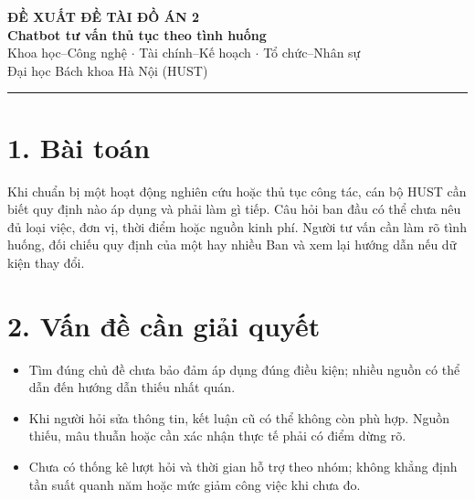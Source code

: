 \documentclass[12pt,a4paper]{article}
\begin{document}
\begin{center}
{\small\bfseries ĐỀ XUẤT ĐỀ TÀI ĐỒ ÁN 2}\\[3pt]
{\Large\bfseries Chatbot tư vấn thủ tục theo tình huống}\\[3pt]
{\small Khoa học--Công nghệ \(\cdot\) Tài chính--Kế hoạch \(\cdot\) Tổ chức--Nhân sự}\\[1pt]
{\small Đại học Bách khoa Hà Nội (HUST)}
\end{center}
\vspace{-5pt}
\noindent\rule{\textwidth}{0.5pt}

\section*{1. Bài toán}
Khi chuẩn bị một hoạt động nghiên cứu hoặc thủ tục công tác, cán bộ HUST cần biết quy định nào áp dụng và phải làm gì tiếp. Câu hỏi ban đầu có thể chưa nêu đủ loại việc, đơn vị, thời điểm hoặc nguồn kinh phí. Người tư vấn cần làm rõ tình huống, đối chiếu quy định của một hay nhiều Ban và xem lại hướng dẫn nếu dữ kiện thay đổi.

\section*{2. Vấn đề cần giải quyết}
\begin{itemize}
\item Tìm đúng chủ đề chưa bảo đảm áp dụng đúng điều kiện; nhiều nguồn có thể dẫn đến hướng dẫn thiếu nhất quán.
\item Khi người hỏi sửa thông tin, kết luận cũ có thể không còn phù hợp. Nguồn thiếu, mâu thuẫn hoặc cần xác nhận thực tế phải có điểm dừng rõ.
\item Chưa có thống kê lượt hỏi và thời gian hỗ trợ theo nhóm; không khẳng định tần suất quanh năm hoặc mức giảm công việc khi chưa đo.
\end{itemize}
\end{document}
